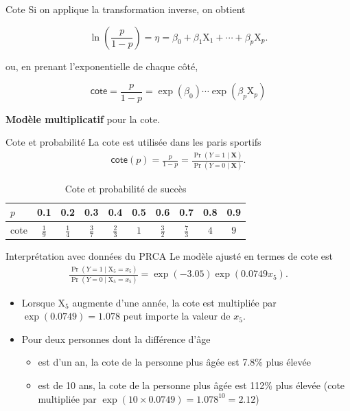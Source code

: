 \documentclass[
  ignorenonframetext,
]{beamer}
\providecommand{\tightlist}{%
  \setlength{\itemsep}{0pt}\setlength{\parskip}{0pt}}\usepackage{longtable,booktabs,array}
\begin{document}
\begin{frame}{Cote}
\protect\hypertarget{cote}{}
Si on applique la transformation inverse, on obtient

\[\ln\left(\frac{p}{1-p} \right) = \eta = \beta_0 + \beta_1 \mathrm{X}_1 + \cdots + \beta_p \mathrm{X}_p.\]

ou, en prenant l'exponentielle de chaque côté,

\[ 
\mathsf{cote} = \frac{p}{1-p} = \exp(\beta_0)\cdots\exp(\beta_p \mathrm{X}_p)
\]

\textbf{Modèle multiplicatif} pour la cote.
\end{frame}

\begin{frame}{Cote et probabilité}
\protect\hypertarget{cote-et-probabilituxe9}{}
La cote est utilisée dans les paris sportifs \begin{align*}
 \mathsf{cote}(p) = \frac{p}{1-p} = \frac{\Pr(Y=1 \mid \mathbf{X})}{\Pr(Y=0 \mid \mathbf{X})}.
\end{align*}

\hypertarget{tbl-cotes}{}
\begin{table}
\caption{\label{tbl-cotes}Cote et probabilité de succès }\tabularnewline

\centering
\begin{tabular}{lccccccccc}
\toprule
\(p\) & 0.1 & 0.2 & 0.3 & 0.4 & 0.5 & 0.6 & 0.7 & 0.8 & 0.9\\
\midrule
cote & \(\frac{1}{9}\) & \(\frac{1}{4}\) & \(\frac{3}{7}\) & \(\frac{2}{3}\) & \(1\) & \(\frac{3}{2}\) & \(\frac{7}{3}\) & \(4\) & \(9\)\\
\bottomrule
\end{tabular}
\end{table}
\end{frame}

\begin{frame}{Interprétation avec données du PRCA}
\protect\hypertarget{interpruxe9tation-avec-donnuxe9es-du-prca}{}
Le modèle ajusté en termes de cote est \begin{align*}
 \frac{\Pr(Y=1 \mid \mathrm{X}_5=x_5)}{\Pr(Y=0 \mid \mathrm{X}_5=x_5)} = \exp(-3.05)\exp(0.0749x_5).
\end{align*}

\small

\begin{itemize}
\tightlist
\item
  Lorsque \(\mathrm{X}_5\) augmente d'une année, la cote est multipliée
  par \(\exp(0.0749) = 1.078\) peut importe la valeur de \(x_5\).
\item
  Pour deux personnes dont la différence d'âge

  \begin{itemize}
  \tightlist
  \item
    est d'un an, la cote de la personne plus âgée est 7.8\% plus élevée
  \item
    est de 10 ans, la cote de la personne plus âgée est 112\% plus
    élevée (cote multipliée par
    \(\exp(10 \times 0.0749)=1.078^{10} = 2.12\))
  \end{itemize}
\end{itemize}

\normalsize
\end{frame}
\end{document}
